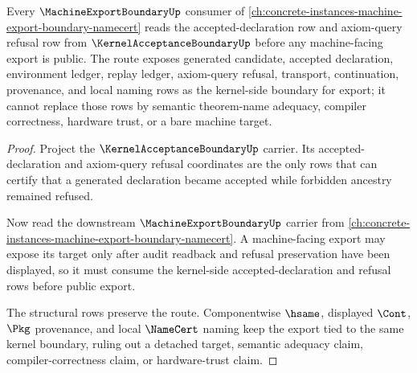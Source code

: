 \begin{theorem}
\label{thm:kernel-acceptance-boundary-machine-export-forward-route}
Every $\MachineExportBoundaryUp$ consumer of \autoref{ch:concrete-instances-machine-export-boundary-namecert} reads the accepted-declaration row and axiom-query refusal row from $\KernelAcceptanceBoundaryUp$ before any machine-facing export is public. The route exposes generated candidate, accepted declaration, environment ledger, replay ledger, axiom-query refusal, transport, continuation, provenance, and local naming rows as the kernel-side boundary for export; it cannot replace those rows by semantic theorem-name adequacy, compiler correctness, hardware trust, or a bare machine target.
\end{theorem}
\begin{proof}
Project the $\KernelAcceptanceBoundaryUp$ carrier. Its accepted-declaration and axiom-query refusal coordinates are the only rows that can certify that a generated declaration became accepted while forbidden ancestry remained refused.

Now read the downstream $\MachineExportBoundaryUp$ carrier from \autoref{ch:concrete-instances-machine-export-boundary-namecert}. A machine-facing export may expose its target only after audit readback and refusal preservation have been displayed, so it must consume the kernel-side accepted-declaration and refusal rows before public export.

The structural rows preserve the route. Componentwise $\hsame$, displayed $\Cont$, $\Pkg$ provenance, and local $\NameCert$ naming keep the export tied to the same kernel boundary, ruling out a detached target, semantic adequacy claim, compiler-correctness claim, or hardware-trust claim.
\end{proof}
